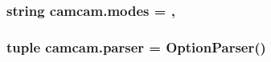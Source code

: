 \subsubsection[{modes}]{\setlength{\rightskip}{0pt plus 5cm}string camcam.\+modes = \textquotesingle{},\textquotesingle{}}\label{namespacecamcam_a6c00ac1541fda0143382c4edb61b1252}
\hypertarget{namespacecamcam_aade6d80745c83b5d4277022028580701}{}
\subsubsection[{parser}]{\setlength{\rightskip}{0pt plus 5cm}tuple camcam.\+parser = Option\+Parser()}\label{namespacecamcam_aade6d80745c83b5d4277022028580701}
